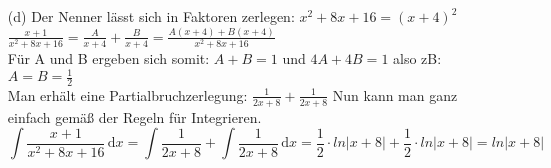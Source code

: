 \documentclass[a4paper,11pt,fleqn]{scrartcl}
\newcommand{\dX}[1]{\, \mathrm{d}#1}
\newcommand{\dx}[0]{\dX{x}}
\begin{document}
\begin{enumerate}
\begin{enumerate}
            \item[(d)]
                Der Nenner lässt sich in Faktoren zerlegen: \(x^2+8x+16 = (x+4)^2 \) \\
                $\frac{x+1}{x^2+8x+16} = \frac{A}{x+4} + \frac{B}{x+4} = \frac{A(x+4)+B(x+4)}{x^2+8x+16}$ \\
                Für A und B ergeben sich somit: $A + B= 1$ und $4A+4B = 1$ also zB: $A=B=\frac{1}{2}$ \\
                Man erhält eine Partialbruchzerlegung: $\frac{1}{2x+8} + \frac{1}{2x+8}$
                Nun kann man ganz einfach gemäß der Regeln für Integrieren. \\
                \[ \int \frac{x+1}{x^2+8x+16} \dx = \int \frac{1}{2x+8} + \int \frac{1}{2x+8} \dx = \frac{1}{2} \cdot ln|x+8| + \frac{1}{2} \cdot ln|x+8| = ln|x+8|  \]
        \end{enumerate}
\end{enumerate}
\end{document}
